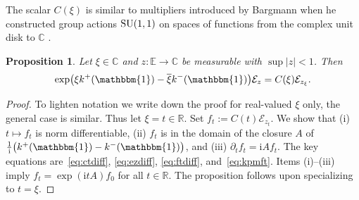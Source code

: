 \documentclass[pdftex]{sigma}
\numberwithin{equation}{section}
\newtheorem{Proposition}[Theorem]{Proposition}
 { \theoremstyle{definition}
\newtheorem{Definition}[Theorem]{Definition}
\newtheorem{Example}[Theorem]{Example}
\newtheorem{Remark}[Theorem]{Remark}
}
\newcommand{\R}{\mathbb{R}}
\newcommand{\C}{\mathbb{C}}
\newcommand{\E}{\mathbb{E}}
\newcommand{\1}{\mathbbm{1}}
\begin{document}
The scalar $C(\xi)$ is similar to multipliers introduced by Bargmann when he constructed group actions ${\rm SU}(1,1)$ on spaces of functions from the complex unit disk to $\C$ \cite[Section 9]{bargmann1947}.

\begin{Proposition} \label{prop:expo-trafo}
	Let $\xi \in \C$ and $z\colon\E\to \C$ be measurable with $\sup |z|<1$.
	Then
	\[
		\exp\bigl( \xi k^+(\1) - \overline \xi k^-(\1)\bigr) \mathcal E_z = C(\xi) \mathcal E_{z_\xi}.
	\]
\end{Proposition}

\begin{proof}
	To lighten notation we write down the proof for real-valued $\xi$ only, the general case is similar. Thus let $\xi = t\in \R$. Set $f_t:= C(t) \mathcal E_{z_t}$. We show that (i) $t\mapsto f_t$ is norm differentiable, (ii) $ f_t$ is in the domain of the closure $A$ of $\frac 1{\mathrm i } \bigl(k^+(\1) - k^-(\1)\bigr)$, and (iii) $\partial_t f_t = \mathrm i A f_t$. The key equations are~\eqref{eq:ctdiff}, \eqref{eq:ezdiff}, \eqref{eq:ftdiff}, and~\eqref{eq:kpmft}. Items (i)--(iii) imply $f_t = \exp(\mathrm i t A) f_0$ for all $t\in\R$. The proposition follows upon specializing to $t = \xi$.


\end{proof}
\end{document}

